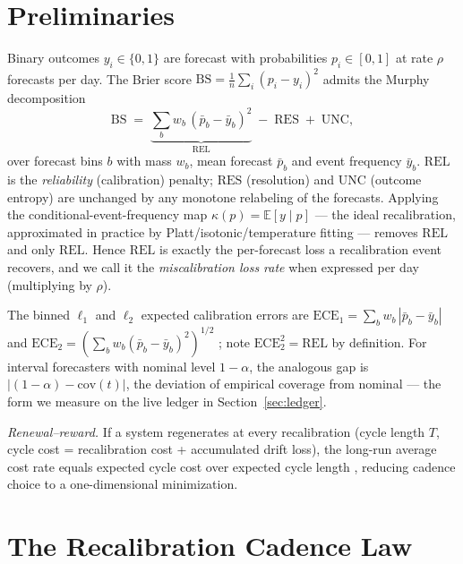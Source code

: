 \documentclass[conference]{IEEEtran}
\begin{document}
\section{Preliminaries}
\label{sec:prelim}

Binary outcomes $y_i\in\{0,1\}$ are forecast with probabilities
$p_i\in[0,1]$ at rate $\rho$ forecasts per day. The Brier score
$\mathrm{BS}=\frac1n\sum_i(p_i-y_i)^2$ \cite{brier1950} admits the Murphy
decomposition \cite{murphy1973}
\begin{equation}
\mathrm{BS} \;=\; \underbrace{\sum_b w_b\,(\bar p_b-\bar y_b)^2}_{\mathrm{REL}}
\;-\;\mathrm{RES}\;+\;\mathrm{UNC},
\label{eq:murphy}
\end{equation}
over forecast bins $b$ with mass $w_b$, mean forecast $\bar p_b$ and event
frequency $\bar y_b$. $\mathrm{REL}$ is the \emph{reliability} (calibration)
penalty; $\mathrm{RES}$ (resolution) and $\mathrm{UNC}$ (outcome entropy) are
unchanged by any monotone relabeling of the forecasts. Applying the
conditional-event-frequency map $\kappa(p)=\mathbb{E}[y\mid p]$ --- the ideal
recalibration, approximated in practice by Platt/isotonic/temperature fitting
--- removes $\mathrm{REL}$ and only $\mathrm{REL}$. Hence
$\mathrm{REL}$ is exactly the per-forecast loss a recalibration event
recovers, and we call it the \emph{miscalibration loss rate} when expressed
per day (multiplying by $\rho$).

The binned $\ell_1$ and $\ell_2$ expected calibration errors are
$\mathrm{ECE}_1=\sum_b w_b\,|\bar p_b-\bar y_b|$ and
$\mathrm{ECE}_2=(\sum_b w_b(\bar p_b-\bar y_b)^2)^{1/2}$
\cite{naeini2015,kumar2019}; note $\mathrm{ECE}_2^2=\mathrm{REL}$ by
definition. For interval forecasters with nominal level $1-\alpha$, the
analogous gap is $|(1-\alpha)-\mathrm{cov}(t)|$, the deviation of empirical
coverage from nominal --- the form we measure on the live ledger in
Section~\ref{sec:ledger}.

\emph{Renewal--reward.} If a system regenerates at every recalibration
(cycle length $T$, cycle cost = recalibration cost + accumulated drift loss),
the long-run average cost rate equals expected cycle cost over expected cycle
length \cite{ross1996}, reducing cadence choice to a one-dimensional
minimization.

\section{The Recalibration Cadence Law}
\label{sec:law}
\end{document}
